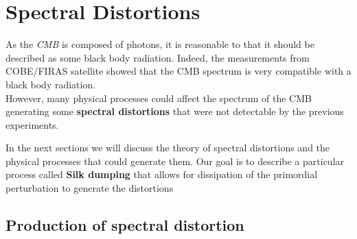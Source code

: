 \chapter{Spectral Distortions}
\label{chap:SpectralDistortions}
As the \emph{CMB} is composed of photons, it is reasonable to that it should be described as some black body radiation. Indeed, the measurements from COBE/FIRAS satellite \cite{COBE1996} showed that the CMB spectrum is very compatible with a black body radiation.\\
However, many physical processes could affect the spectrum of the CMB generating some \textbf{spectral distortions} that were not detectable by the previous experiments.

In the next sections we will discuss the theory of spectral distortions and the physical processes that could generate them. Our goal is to describe a particular process called \textbf{Silk dumping} that allows for dissipation of the primordial perturbation to generate the distortions
\section{Production of spectral distortion}
